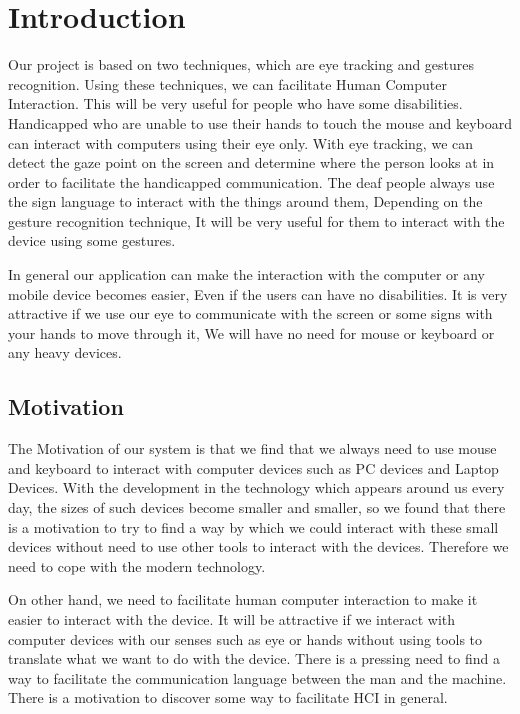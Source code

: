 \chapter{Introduction}
Our project is based on two techniques, which are eye tracking and gestures recognition. Using these techniques, we can facilitate Human Computer Interaction. This will be very useful for people who have some disabilities. Handicapped who are unable to use their hands to touch the mouse and keyboard can interact with computers using their eye only. With eye tracking, we can detect the gaze point on the screen and determine where the person looks at in order to facilitate the handicapped communication. The deaf people always use the sign language to interact with the things around them, Depending on the gesture recognition technique, It will be very useful for them to interact with the device using some gestures. \bigskip

In general our application can make the interaction with the computer or any mobile device becomes easier, Even if the users can have no disabilities. It is very attractive if we use our eye to communicate with the screen or some signs with your hands to move through it, We will have no need for mouse or keyboard or any heavy devices.

\section{Motivation} 
The Motivation of our system is that we find that we always need to use mouse and keyboard to interact with computer devices such as PC devices and Laptop Devices. With the development in the technology which appears around us every day, the sizes of such devices become smaller and smaller, so we found that there is a motivation to try to find a way by which we could interact with these small devices without need to use other tools to interact with the devices. Therefore we need to cope with the modern technology. \bigskip

On other hand, we need to facilitate human computer interaction to make it easier to interact with the device. It will be attractive if we interact with computer devices with our senses such as eye or hands without using tools to translate what we want to do with the device. There is a pressing need to find a way to facilitate the communication language between the man and the machine. There is a motivation to discover some way to facilitate HCI in general. \bigskip

